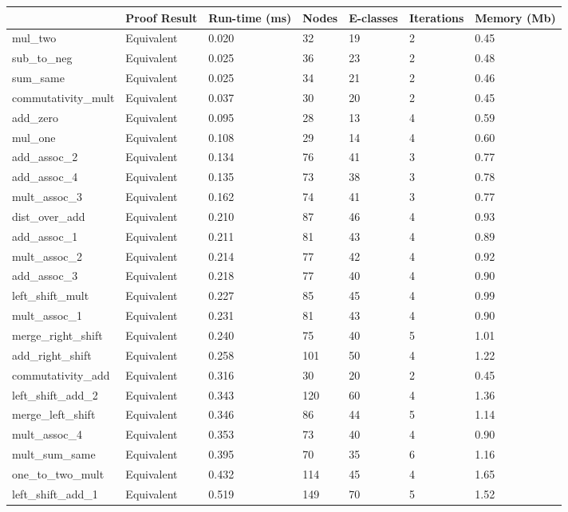 \begin{tabular}{lllllll}
\toprule
 & Proof Result & Run-time (ms) & Nodes & E-classes & Iterations & Memory (Mb) \\
\midrule
mul\_two & Equivalent & 0.020 & 32 & 19 & 2 & 0.45 \\
sub\_to\_neg & Equivalent & 0.025 & 36 & 23 & 2 & 0.48 \\
sum\_same & Equivalent & 0.025 & 34 & 21 & 2 & 0.46 \\
commutativity\_mult & Equivalent & 0.037 & 30 & 20 & 2 & 0.45 \\
add\_zero & Equivalent & 0.095 & 28 & 13 & 4 & 0.59 \\
mul\_one & Equivalent & 0.108 & 29 & 14 & 4 & 0.60 \\
add\_assoc\_2 & Equivalent & 0.134 & 76 & 41 & 3 & 0.77 \\
add\_assoc\_4 & Equivalent & 0.135 & 73 & 38 & 3 & 0.78 \\
mult\_assoc\_3 & Equivalent & 0.162 & 74 & 41 & 3 & 0.77 \\
dist\_over\_add & Equivalent & 0.210 & 87 & 46 & 4 & 0.93 \\
add\_assoc\_1 & Equivalent & 0.211 & 81 & 43 & 4 & 0.89 \\
mult\_assoc\_2 & Equivalent & 0.214 & 77 & 42 & 4 & 0.92 \\
add\_assoc\_3 & Equivalent & 0.218 & 77 & 40 & 4 & 0.90 \\
left\_shift\_mult & Equivalent & 0.227 & 85 & 45 & 4 & 0.99 \\
mult\_assoc\_1 & Equivalent & 0.231 & 81 & 43 & 4 & 0.90 \\
merge\_right\_shift & Equivalent & 0.240 & 75 & 40 & 5 & 1.01 \\
add\_right\_shift & Equivalent & 0.258 & 101 & 50 & 4 & 1.22 \\
commutativity\_add & Equivalent & 0.316 & 30 & 20 & 2 & 0.45 \\
left\_shift\_add\_2 & Equivalent & 0.343 & 120 & 60 & 4 & 1.36 \\
merge\_left\_shift & Equivalent & 0.346 & 86 & 44 & 5 & 1.14 \\
mult\_assoc\_4 & Equivalent & 0.353 & 73 & 40 & 4 & 0.90 \\
mult\_sum\_same & Equivalent & 0.395 & 70 & 35 & 6 & 1.16 \\
one\_to\_two\_mult & Equivalent & 0.432 & 114 & 45 & 4 & 1.65 \\
left\_shift\_add\_1 & Equivalent & 0.519 & 149 & 70 & 5 & 1.52 \\
\bottomrule
\end{tabular}
